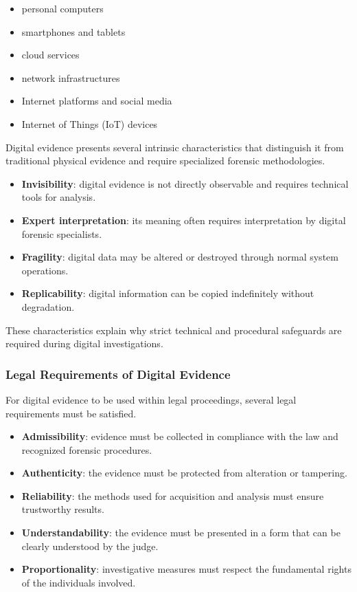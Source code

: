 \begin{itemize}
\item personal computers
\item smartphones and tablets
\item cloud services
\item network infrastructures
\item Internet platforms and social media
\item Internet of Things (IoT) devices
\end{itemize}
\bigskip

\noindent
Digital evidence presents several intrinsic characteristics that distinguish it from traditional physical evidence and require specialized forensic methodologies.

\begin{itemize}
\item \textbf{Invisibility}: digital evidence is not directly observable and requires technical tools for analysis.
\item \textbf{Expert interpretation}: its meaning often requires interpretation by digital forensic specialists.
\item \textbf{Fragility}: digital data may be altered or destroyed through normal system operations.
\item \textbf{Replicability}: digital information can be copied indefinitely without degradation.
\end{itemize}

\medskip

\noindent
These characteristics explain why strict technical and procedural safeguards are required during digital investigations.

\medskip

\subsubsection{Legal Requirements of Digital Evidence}

\noindent
For digital evidence to be used within legal proceedings, several legal requirements must be satisfied.

\medskip

\begin{itemize}
\item \textbf{Admissibility}: evidence must be collected in compliance with the law and recognized forensic procedures.
\item \textbf{Authenticity}: the evidence must be protected from alteration or tampering.
\item \textbf{Reliability}: the methods used for acquisition and analysis must ensure trustworthy results.
\item \textbf{Understandability}: the evidence must be presented in a form that can be clearly understood by the judge.
\item \textbf{Proportionality}: investigative measures must respect the fundamental rights of the individuals involved.
\end{itemize}

